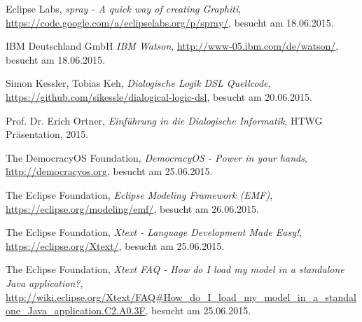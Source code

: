 \documentclass[11pt,a4paper,bibtotocnumbered]{scrreprt}
\begin{document}
\begin{singlespace}
\begin{thebibliography}{9}


  Eclipse Labs,
  \emph{spray - A quick way of creating Graphiti},
  \url{https://code.google.com/a/eclipselabs.org/p/spray/},
  besucht am 18.06.2015.   
  
  IBM Deutschland GmbH
  \emph{IBM Watson},
  \url{http://www-05.ibm.com/de/watson/},
  besucht am 18.06.2015.
  
  Simon Kessler, Tobias Keh,
  \emph{Dialogische Logik DSL Quellcode},
  \url{https://github.com/sikessle/dialogical-logic-dsl},
  besucht am 20.06.2015.

  Prof. Dr. Erich Ortner,
  \emph{Einf{\"u}hrung in die Dialogische Informatik},
  HTWG Präsentation,
  2015.
  
  The DemocracyOS Foundation,
  \emph{DemocracyOS - Power in your hands},
  \url{http://democracyos.org},
  besucht am 25.06.2015.
  
  The Eclipse Foundation,
  \emph{Eclipse Modeling Framework (EMF)},
  \url{https://eclipse.org/modeling/emf/},
  besucht am 26.06.2015.

  The Eclipse Foundation,
  \emph{Xtext - Language Development Made Easy!},
  \url{https://eclipse.org/Xtext/},
  besucht am 25.06.2015.
  
  The Eclipse Foundation,
  \emph{Xtext FAQ - How do I load my model in a standalone Java application?},
  \url{http://wiki.eclipse.org/Xtext/FAQ#How_do_I_load_my_model_in_a_standalone_Java_application.C2.A0.3F},
  besucht am 25.06.2015.
  
  

\end{thebibliography}
\end{singlespace}
\end{document}
